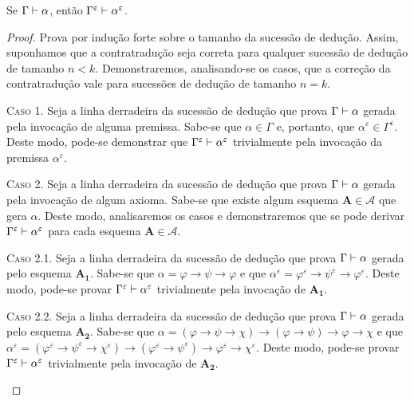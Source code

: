     \begin{theorem}
        Se $\Gamma\mathrel{\vdash}\alpha$, então $\Gamma^\varepsilon\mathrel{\vdash}\alpha^\varepsilon$.

        \begin{proof}
            Prova por indução forte sobre o tamanho da sucessão de dedução.
            Assim, suponhamos que a contratradução seja correta para qualquer sucessão de dedução de tamanho $n < k$.
            Demonstraremos, analisando-se os casos, que a correção da contratradução vale para sucessões de dedução de tamanho $n = k$.

            \begin{case}
                \textsc{Caso 1.}
                Seja a linha derradeira da sucessão de dedução que prova $\Gamma\mathrel{\vdash}\alpha$ gerada pela invocação de alguma premissa.
                Sabe-se que $\alpha\in\Gamma$ e, portanto, que $\alpha^\varepsilon\in\Gamma^\varepsilon$.
                Deste modo, pode-se demonstrar que $\Gamma^\varepsilon\mathrel{\vdash}\alpha^\varepsilon$ trivialmente pela invocação da premissa $\alpha^\varepsilon$.
            \end{case}

            \begin{case}
                \textsc{Caso 2.}
                Seja a linha derradeira da sucessão de dedução que prova $\Gamma\mathrel{\vdash}\alpha$ gerada pela invocação de algum axioma.
                Sabe-se que existe algum esquema $\mathbf{A}\in\mathcal{A}$ que gera $\alpha$. 
                Deste modo, analisaremos os casos e demonstraremos que se pode derivar $\Gamma^\varepsilon\mathrel{\vdash}\alpha^\varepsilon$ para cada esquema $\mathbf{A}\in\mathcal{A}$.
            \end{case}

                \begin{subcase}
                    \textsc{Caso 2.1.}
                    Seja a linha derradeira da sucessão de dedução que prova $\Gamma\mathrel{\vdash}\alpha$ gerada pelo esquema $\hyperref[MA1]{\mathbf{A_1}}$.
                    Sabe-se que $\alpha=\varphi\to\psi\to\varphi$ e que $\alpha^\varepsilon=\varphi^\varepsilon\to\psi^\varepsilon\to\varphi^\varepsilon$.
                    Deste modo, pode-se provar $\Gamma^\varepsilon\mathrel{\vdash}\alpha^\varepsilon$ trivialmente pela invocação de $\hyperref[IA1]{\mathbf{A_1}}$.
                \end{subcase}

                \begin{subcase}
                    \textsc{Caso 2.2.}
                    Seja a linha derradeira da sucessão de dedução que prova $\Gamma\mathrel{\vdash}\alpha$ gerada pelo esquema $\hyperref[MA2]{\mathbf{A_2}}$.
                    Sabe-se que $\alpha=(\varphi\to\psi\to\chi)\to(\varphi\to\psi)\to\varphi\to\chi$ e que $\alpha^\varepsilon=(\varphi^\varepsilon\to\psi^\varepsilon\to\chi^\varepsilon)\to(\varphi^\varepsilon\to\psi^\varepsilon)\to\varphi^\varepsilon\to\chi^\varepsilon$.
                    Deste modo, pode-se provar $\Gamma^\varepsilon\mathrel{\vdash}\alpha^\varepsilon$ trivialmente pela invocação de $\hyperref[IA2]{\mathbf{A_2}}$.
                \end{subcase}


\end{proof}
\end{theorem}
